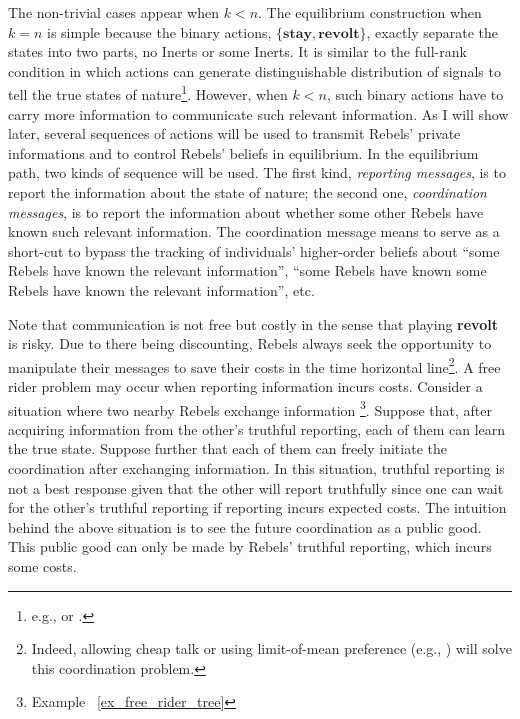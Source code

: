 \documentclass[12pt,letter]{article}
\theoremstyle{definition}
\theoremstyle{remark}
\theoremstyle{claim}
\begin{document}
The non-trivial cases appear when $k<n$. The equilibrium construction when $k=n$ is simple because the binary actions, $\{\textbf{stay},\textbf{revolt}\}$, exactly separate the states into two parts, no Inerts or some Inerts. It is similar to the full-rank condition in which actions can generate distinguishable distribution of signals to tell the true states of nature\footnote{e.g., \citep{Fudenberg2010} or \citep{Fudenberg2011}.}. However, when $k<n$, such binary actions have to carry more information to communicate such relevant information. As I will show later, several sequences of actions will be used to transmit Rebels' private informations and to control Rebels' beliefs in equilibrium. In the equilibrium path, two kinds of sequence will be used. The first kind, \textit{reporting messages}, is to report the information about the state of nature; the second one, \textit{coordination messages}, is to report the information about whether some other Rebels have known such relevant information. The coordination message means to serve as a short-cut to bypass the tracking of individuals' higher-order beliefs about ``some Rebels have known the relevant information'', ``some Rebels have known some Rebels have known the relevant information'', etc.

Note that communication is not free but costly in the sense that playing \textbf{revolt} is risky. Due to there being discounting, Rebels always seek the opportunity to manipulate their messages to save their costs in the time horizontal line\footnote{Indeed, allowing cheap talk or using limit-of-mean preference (e.g., \citep{Renault1998}) will solve this coordination problem.}. A free rider problem may occur when reporting information incurs costs. Consider a situation where two nearby Rebels exchange information \footnote{Example ~\ref{ex_free_rider_tree}}. Suppose that,  after acquiring information from the other's truthful reporting, each of them can learn the true state. Suppose further that each of them can freely initiate the coordination after exchanging information. In this situation, truthful reporting is not a best response given that the other will report truthfully since one can wait for the other's truthful reporting if reporting incurs expected costs. The intuition behind the above situation is to see the future coordination as a public good. This public good can only be made by Rebels' truthful reporting, which incurs some costs.
\end{document}
